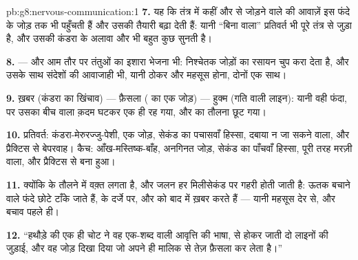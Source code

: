\begin{solution}{pb:g8:nervous-communication:1}
\textbf{7.} यह कि तंत्र में कहीं और से जोड़ने वाले  की आवाज़ें
इस फंदे के जोड़ तक भी पहुँचती हैं और उसकी तैयारी बढ़ा देती हैं: यानी
``बिना  वाला'' प्रतिवर्त भी पूरे तंत्र से जुड़ा है, और उसकी
 कंडरा के अलावा और भी बहुत कुछ सुनती है।

\textbf{8.}  --- और आम तौर पर तंतुओं का इशारा भेजना भी:
निश्चेतक जोड़ों का रसायन चुप करा देता है, और उसके साथ संदेशों की आवाजाही
भी, यानी ठोकर और महसूस होना, दोनों एक साथ।

\textbf{9.} ख़बर (कंडरा का खिंचाव) --- फ़ैसला ( का एक जोड़)
--- हुक्म (गति वाली लाइन): यानी वही फंदा, पर उसका बीच वाला क़दम घटकर एक
ही  रह गया, और  का तौलना छूट गया।

\textbf{10.} प्रतिवर्त: कंडरा-मेरुरज्जु-पेशी, एक जोड़, सेकंड का पचासवाँ
हिस्सा, दबाया न जा सकने वाला, और प्रैक्टिस से बेपरवाह। कैच:
आँख-मस्तिष्क-बाँह, अनगिनत जोड़, सेकंड का पाँचवाँ हिस्सा, पूरी तरह मरज़ी
वाला, और प्रैक्टिस से बना हुआ।

\textbf{11.} क्योंकि  के तौलने में वक़्त लगता है, और जलन हर
मिलीसेकंड पर गहरी होती जाती है: ऊतक बचाने वाले फंदे छोटे टाँके जाते हैं,
 के दर्जे पर, और  को बाद में ख़बर करते हैं --- यानी
महसूस देर से, और बचाव पहले ही।

\textbf{12.} ``हथौड़े की एक ही चोट ने वह एक-शब्द वाली आवृत्ति की भाषा,
 से होकर जाती दो लाइनों की जुड़ाई, और वह जोड़ दिखा दिया जो अपने
ही मालिक से तेज़ फ़ैसला कर लेता है।''
\end{solution}
